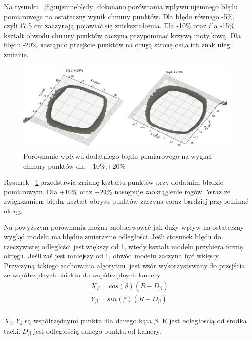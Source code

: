 Na rysunku ~\ref{fig:ujemnebledy} dokonano porównania wpływu ujemnego błędu pomiarowego na ostateczny wynik chmury punktów. Dla błędu równego -5\%, czyli 47.5 cm zaczynają pojawiać się zniekształcenia. Dla -10\% oraz dla -15\% kształt obwodu chmury punktów zaczyna przypominać krzywą motylkową. Dla błędu -20\% nastąpiło przejście punktów na drugą stronę osi,a ich znak uległ zmianie.
\begin{figure}[H]
  \centering
  \includegraphics[scale=0.4]{bledydodatnie.png}
  \caption{Porównanie wpływu dodatniego błędu pomiarowego na wygląd chmury punktów dla +10\%,+20\%.}   
  \label{fig:dodatniebledy}
\end{figure}
Rysunek ~\ref{fig:dodatniebledy} przedstawia zmianę kształtu punktów przy dodatnim błędzie pomiarowym. Dla +10\% oraz +20\% następuje zaokrąglenie rogów. Wraz ze zwiększaniem błędu, kształt obrysu punktów zaczyna coraz bardziej przypominać okrąg.

Na powyższym porównaniu można zaobserwować jak duży wpływ na ostateczny wygląd modelu ma błędne zmierzenie odległości. Jeśli stosunek błędu do rzeczywistej odległości jest większy od 1, wtedy kształt modelu przybiera formę okręgu. Jeśli zaś jest mniejszy od 1, obwód modelu zaczyna być wklęsły. Przyczyną takiego zachowania algorytmu jest wzór wykorzystywany do przejścia ze współrzędnych obiektu do współrzędnych kamery. 
\begin{equation}
    \begin{aligned}
            & X_{\beta}=cos(\beta)(R-D_{\beta})  \\
            & Y_{\beta}=sin(\beta)(R-D_{\beta})  \\
    \end{aligned}
\end{equation}

$X_{\beta},Y_{\beta}$ są współrzędnymi punktu dla danego kąta $\beta$. R jest odległością od środka tacki. $D_{\beta}$ jest odległością danego punktu od kamery.

